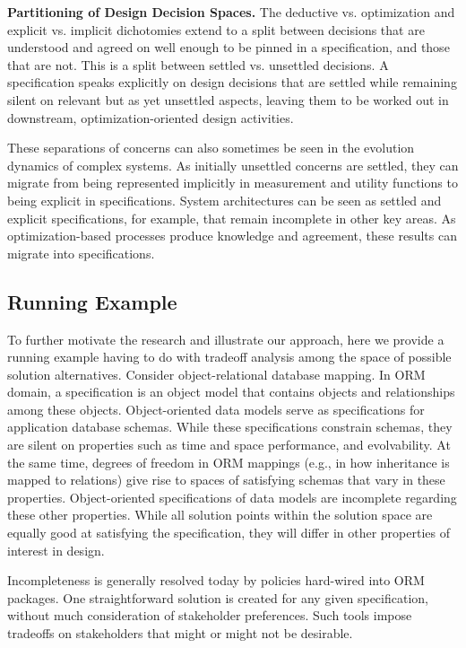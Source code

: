 \documentclass{sig-alternate}
\begin{document}
\textbf{Partitioning of Design Decision Spaces.}
The deductive vs. optimization and explicit vs. implicit dichotomies extend to a split between decisions that are understood and agreed on well enough to be pinned in a specification, and those that are not. This is a split between settled vs. unsettled decisions. A specification speaks explicitly on design decisions that are settled while remaining silent on relevant but as yet unsettled aspects, leaving them to be worked out in downstream, optimization-oriented design activities.

These separations of concerns can also sometimes be seen in the evolution dynamics of complex systems. As initially unsettled concerns are settled, they can migrate from being represented implicitly in measurement and utility functions to being explicit in specifications. System architectures can be seen as settled and explicit specifications, for example, that remain incomplete in other key areas. As optimization-based processes produce knowledge and agreement, these results can migrate into specifications.

\subsection{Running Example}
To further motivate the research and illustrate our approach, here we provide a running example having to do with tradeoff analysis among the space of possible solution alternatives. Consider object-relational database mapping. In ORM domain, a specification is an object model that contains objects and relationships among these objects. Object-oriented data models serve as specifications for application database schemas. %
While these specifications constrain schemas, they are silent on properties such as time and space performance, and evolvability. At the same time, degrees of freedom in ORM mappings (e.g., in how inheritance is mapped to relations) give rise to spaces of satisfying schemas that vary in these properties. Object-oriented specifications of data models are incomplete regarding these other properties.
While all solution points within the solution space are equally good at satisfying the specification, they will differ in other properties of interest in design.  

Incompleteness is generally resolved today by policies hard-wired into ORM packages. One straightforward solution is created for any given specification, without much consideration of stakeholder preferences. Such tools impose tradeoffs on stakeholders that might or might not be desirable.
\end{document}
